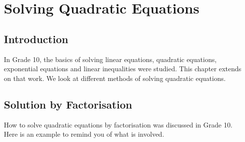 \chapter{Solving Quadratic Equations}
\label{m:se:q11}


\section{Introduction}
In Grade 10, the basics of solving linear equations, quadratic equations, exponential equations and linear inequalities were studied. This chapter extends on that work. We look at different methods of solving quadratic equations.

\section{Solution by Factorisation}

How to solve quadratic equations by factorisation was discussed in Grade 10. Here is an example to remind you of what is involved.

